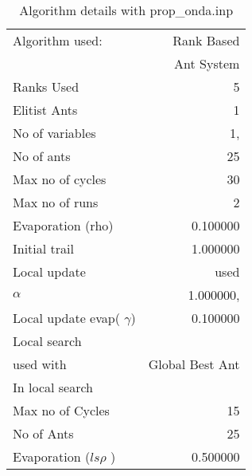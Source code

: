 \begin{table}[!hp] \label{algodetails}
  \begin{center}
 \caption{Algorithm details  with prop_onda.inp }
 \begin{tabular}{|l|r|} \hline 
Algorithm used:&Rank Based \\
 &Ant System\\
\hline
Ranks Used & 5 \\ 
 Elitist Ants & 1 \\
\hline
No of variables &  1,\\
No of ants & 25 \\
Max no of cycles &  30\\
 Max no of runs & 2\\
Evaporation (rho) &  0.100000 \\
Initial trail & 1.000000 \\
\hline
Local update & used\\
$\alpha$ &  1.000000,\\
Local update evap( $\gamma$) &  0.100000 \\
 \hline Local search & \\
 used with& Global Best Ant\\
\hline
In local search & \\ \hline 
 Max no of Cycles &  15\\
No of Ants  & 25\\
Evaporation ($ls \rho$ ) &  0.500000 \\
\hline 
 \end{tabular}
 \end{center}
 \end{table}



